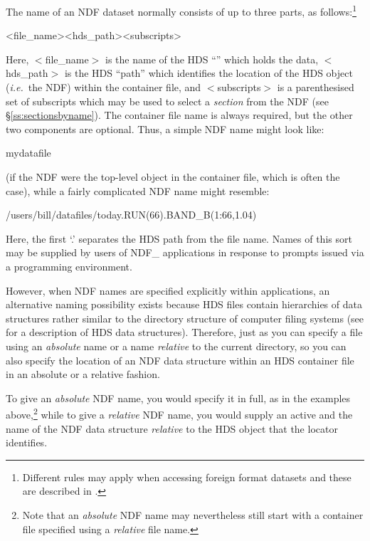 \documentclass[twoside,11pt,nolof]{starlink}
\providecommand{\st}[1]{{\emph{#1}}}
\begin{document}
The name of an NDF dataset normally consists of up to three parts, as
follows:\footnote{Different rules may apply when accessing foreign
format datasets and these are described in .}

\small
\begin{terminalv}
      <file_name><hds_path><subscripts>
\end{terminalv}
\normalsize

Here, $<$file\_name$>$ is the name of the HDS ``'' which holds the data, $<$hds\_path$>$ is
the HDS ``path'' which identifies the location of the HDS object
(\st{i.e.}\ the NDF) within the container file, and $<$subscripts$>$
is a
parenthesised set of subscripts which may be used to select a \st{section} from the NDF (see \S\ref{ss:sectionsbyname}). The container
file name is always required, but the other two components are
optional. Thus, a simple NDF name might look like:

\small
\begin{terminalv}
      mydatafile
\end{terminalv}
\normalsize

(if the NDF were the top-level object in the container file, which is
often the case), while a fairly complicated NDF name might resemble:

\small
\begin{terminalv}
      /users/bill/datafiles/today.RUN(66).BAND_B(1:66,1.04)
\end{terminalv}
\normalsize

Here, the first `.' separates the HDS path from the file name. Names
of this sort may be supplied by users of NDF\_ applications in
response to prompts issued via a programming environment.

However, when NDF names are specified explicitly within applications,
an alternative naming possibility exists because HDS files contain
hierarchies of data structures rather similar to the directory
structure of computer filing systems (see
 for a description of HDS data
structures).  Therefore, just as you can specify a file using an
\st{absolute\/} name or a name \st{relative\/} to the current
directory,
so you can also specify the location of an NDF data structure within
an HDS container file in an absolute or a relative fashion.

To give an \st{absolute\/} NDF name, you would specify it in full, as
in the examples above,\footnote{Note that an \st{absolute\/} NDF name
may nevertheless still start with a container file specified using a
\st{relative\/} file name.} while to give a \st{relative\/} NDF
name, you would supply an active  and the name of the NDF data structure
\st{relative\/} to the HDS object that the locator identifies.
\end{document}

